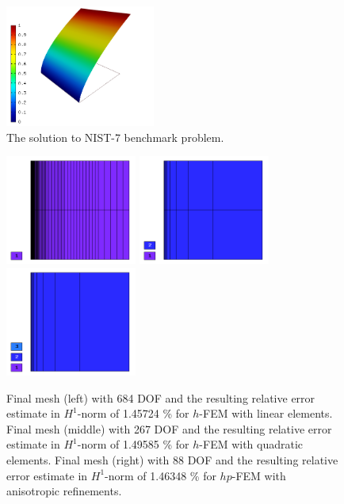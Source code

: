 \documentclass[12pt]{elsarticle}
\begin{document}
\begin{figure}[H]
\centering
\vspace{-5mm}
\includegraphics[height=4cm]{nist/nist-7/solution.png}
\vspace{-5mm}
\caption{The solution to NIST-7 benchmark problem.}
\vspace{-2mm}
\label{fig:sln-nist07}
\end{figure}

\begin{figure}[H]
\centering
\vspace{-5mm}
\includegraphics[height=3.6cm]{nist/nist-7/mesh_h1_aniso.png}
\includegraphics[height=3.6cm]{nist/nist-7/mesh_h2_aniso.png}
\includegraphics[height=3.6cm]{nist/nist-7/mesh_hp_aniso.png}
\vspace{-5mm}
\caption{
Final mesh (left) with 684 DOF and the resulting
relative error estimate in $H^1$-norm of 1.45724 \% for $h$-FEM with linear elements.
Final mesh (middle) with 267 DOF and the resulting
relative error estimate in $H^1$-norm of 1.49585 \% for $h$-FEM with quadratic elements.
Final mesh (right) with 88 DOF and the resulting
relative error estimate in $H^1$-norm of 1.46348 \% for $hp$-FEM with anisotropic refinements.}
\vspace{-5mm}
\label{fig:nist-7-hp-aniso}
\end{figure}
\end{document}
